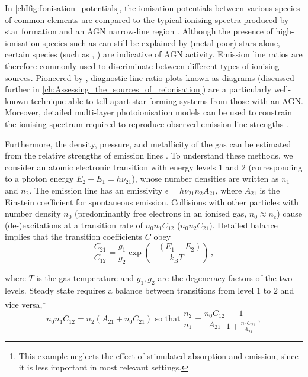 In \cref{chIfig:Ionisation_potentials}, the ionisation potentials between various species of common elements are compared to the typical ionising spectra produced by star formation and an AGN narrow-line region \citep{2016MNRAS.456.3354F}. Although the presence of high-ionisation species such as  can still be explained by (metal-poor) stars alone, certain species (such as , ) are indicative of AGN activity. Emission line ratios are therefore commonly used to discriminate between different types of ionising sources. Pioneered by \citet*[;  hereafter]{1981PASP...93....5B}, diagnostic line-ratio plots known as  diagrams (discussed further in \cref{ch:Assessing_the_sources_of_reionisation}) are a particularly well-known technique able to tell apart star-forming systems from those with an AGN. Moreover, detailed multi-layer photoionisation models can be used to constrain the ionising spectrum required to reproduce observed emission line strengths \citep[e.g.][]{2021ApJ...922..170B}.

Furthermore, the density, pressure, and metallicity of the gas can be estimated from the relative strengths of emission lines \citep{2017PASP..129h2001P, 2019ARA&A..57..511K}. To understand these methods, we consider an atomic electronic transition with energy levels $1$ and $2$ (corresponding to a photon energy $E_2 - E_1 = h \nu_{21}$), whose number densities are written as $n_1$ and $n_2$. The emission line has an emissivity $\epsilon = h \nu_{21} n_2 A_{21}$, where $A_{21}$ is the Einstein coefficient for spontaneous emission. Collisions with other particles with number density $n_0$ (predominantly free electrons in an ionised gas, $n_0 \approx n_e$) cause (de-)excitations at a transition rate of $n_0 n_1 C_{12}$ ($n_0 n_2 C_{21}$). Detailed balance implies that the transition coefficients $C$ obey
\begin{equation}
    \label{chIeq:Collisional_excitation_rates}
    \frac{C_{21}}{C_{12}} = \frac{g_1}{g_2} \exp \left( \frac{- \left( E_1 - E_2 \right)}{k_\text{B} T} \right) \, ,
\end{equation}

\noindent where $T$ is the gas temperature and $g_1, g_2$ are the degeneracy factors of the two levels. Steady state requires a balance between transitions from level $1$ to $2$ and vice versa,\footnote{This example neglects the effect of stimulated absorption and emission, since it is less important in most relevant settings.}
\begin{equation}
    \label{chIeq:Collisional_excitation_equilibrium}
    n_0 n_1 C_{12} = n_2 \left( A_{21} + n_0 C_{21} \right) \text{ so that } \frac{n_2}{n_1} = \frac{n_0 C_{12}}{A_{21}} \frac{1}{1 + \frac{n_0 C_{21}}{A_{21}}} \, ,
\end{equation}

